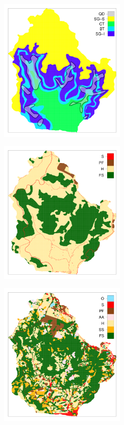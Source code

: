 \begin{figure}[!ht]
\begin{minipage}[b]{63mm}
 \end{minipage}
 \begin{minipage}[b]{63mm}
  \label{fig:chap06-geo-new}
  \centering
  \includegraphics[width=60mm]{fig/chap06-FIG3e}
 \end{minipage}
 \begin{minipage}[b]{63mm}
  \label{fig:chap06-land-old}
  \centering
  \includegraphics[width=60mm]{fig/chap06-FIG3c}
 \end{minipage}
 \begin{minipage}[b]{63mm}
  \label{fig:chap06-land-new}
  \centering
  \includegraphics[width=60mm]{fig/chap06-FIG3f}

\end{minipage}
\end{figure}
